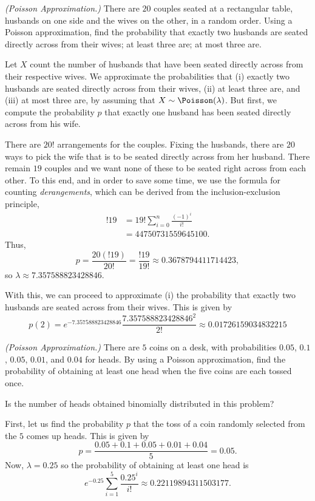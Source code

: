 \begin{problem}[Handout 10, \# 6]
  \emph{(Poisson Approximation.)} There are \(20\) couples seated at a
  rectangular table, husbands on one side and the wives on the other, in a
  random order. Using a Poisson approximation, find the probability that
  exactly two husbands are seated directly across from their wives; at
  least three are; at most three are.
\end{problem}
\begin{solution}
  Let \(X\) count the number of husbands that have been seated directly
  across from their respective wives. We approximate the probabilities that
  (i) exactly two husbands are seated directly across from their wives,
  (ii) at least three are, and (iii) at most three are, by assuming that
  \(X\sim\Poisson(\lambda)\). But first, we compute the probability \(p\)
  that exactly one husband has been seated directly across from his wife.

  There are \(20!\) arrangements for the
  couples. Fixing the husbands, there are \(20\) ways to pick the wife that
  is to be seated directly across from her husband. There remain \(19\)
  couples and we want none of these to be seated right across from each
  other. To this end, and in order to save some time, we use the formula
  for counting \emph{derangements}, which can be derived from the
  inclusion-exclusion principle,
  \begin{align*}
    !19&=19!\sum_{i=0}^n\frac{(-1)^i}{i!}\\
       &=\num{44750731559645100}.
  \end{align*}
  Thus,
  \[
    p=\frac{20(!19)}{20!}=\frac{!19}{19!}\approx\num{0.3678794411714423},
  \]
  so \(\lambda\approx\num{7.357588823428846}\).

  With this, we can proceed to approximate (i) the probability that exactly
  two husbands are seated across from their wives. This is given by
  \[
    p(2)=e^{-\num{7.357588823428846}}\frac{\num{7.357588823428846}^2}{2!}
    \approx\num{0.01726159034832215}
  \]
\end{solution}
\newpage

\begin{problem}[Handout 10, \# 7]
  \emph{(Poisson Approximation.)} There are \(5\) coins on a desk, with
  probabilities \(0.05\), \(0.1\), \(0.05\), \(0.01\), and \(0.04\) for
  heads. By using a Poisson approximation, find the probability of
  obtaining at least one head when the five coins are each tossed once.

  \noindent Is the number of heads obtained binomially distributed in this
  problem?
\end{problem}
\begin{solution}
  First, let us find the probability \(p\) that the toss of a coin randomly
  selected from the \(5\) comes up heads. This is given by
  \[
    p=\frac{0.05+0.1+0.05+0.01+0.04}{5}=0.05.
  \]
  Now, \(\lambda=0.25\) so the probability of obtaining at least one head
  is
  \[
    e^{-0.25}\sum_{i=1}^5 \frac{0.25^i}{i!}\approx\num{0.22119894311503177}.
  \]
\end{solution}
\newpage

